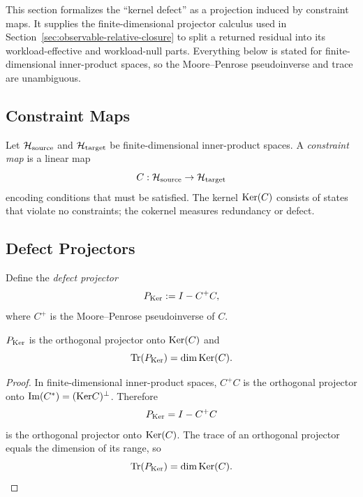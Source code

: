\label{sec:boundary-defect}

This section formalizes the ``kernel defect'' as a projection induced by
constraint maps. It supplies the finite-dimensional projector calculus used in
Section~\ref{sec:observable-relative-closure} to split a returned residual into
its workload-effective and workload-null parts. Everything below is stated for
finite-dimensional inner-product spaces, so the Moore--Penrose pseudoinverse
and trace are unambiguous.

\subsection{Constraint Maps}

\begin{definition}
\label{def:constraint-map}
Let $\mathcal{H}_{\mathrm{source}}$ and $\mathcal{H}_{\mathrm{target}}$ be
finite-dimensional inner-product spaces. A \emph{constraint map} is a linear
map
\[
C:\mathcal{H}_{\mathrm{source}}\to\mathcal{H}_{\mathrm{target}}
\]
encoding conditions that must be satisfied. The kernel $\mathrm{Ker}(C)$ consists of
states that violate no constraints; the cokernel measures redundancy or defect.
\end{definition}

\subsection{Defect Projectors}

\begin{definition}
\label{def:defect-projector}
Define the \emph{defect projector}
\[
P_{\mathrm{Ker}} := I - C^+C,
\]
where $C^+$ is the Moore--Penrose pseudoinverse of $C$.
\end{definition}

\begin{lemma}
\label{lem:trace-ker}
$P_{\mathrm{Ker}}$ is the orthogonal projector onto $\mathrm{Ker}(C)$ and
\[
\mathrm{Tr}(P_{\mathrm{Ker}}) = \dim\mathrm{Ker}(C).
\]
\end{lemma}

\begin{proof}
In finite-dimensional inner-product spaces, $C^+C$ is the orthogonal projector
onto $\mathrm{Im}(C^\ast) = (\mathrm{Ker} C)^\perp$. Therefore
\[
P_{\mathrm{Ker}}=I-C^+C
\]
is the orthogonal projector onto $\mathrm{Ker}(C)$. The trace of an orthogonal
projector equals the dimension of its range, so
\[
\mathrm{Tr}(P_{\mathrm{Ker}})=\dim\mathrm{Ker}(C).
\]
\end{proof}

